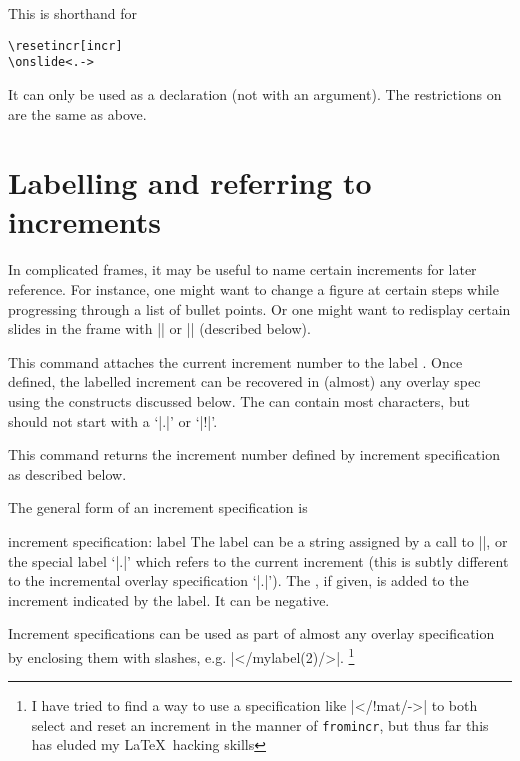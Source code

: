 \documentclass[a4paper]{ltxdoc}
\begin{document}
\begin{command}{\fromincr{}}
  This is shorthand for
\begin{verbatim}
\resetincr[incr]
\onslide<.->
\end{verbatim}
It can only be used as a declaration (not with an argument).  The restrictions
on  are the same as above.  
\end{command}


\section{Labelling and referring to increments}\label{sec:labels}

In complicated frames, it may be useful to name certain increments for later
reference.  For instance, one might want to change a figure at certain steps
while progressing through a list of bullet points.  Or one might want to
redisplay certain slides in the frame with |\afterframe| or |\handoutframe|
(described below).

\begin{command}{\incrlabel {}}
  This command attaches the current increment number to the label .
  Once defined, the labelled increment can be recovered in (almost) any overlay
  spec using the constructs discussed below.  The  can contain most
  characters, but should not start with a `|.|'  or `|!|'.
\end{command}

\begin{command}{\incrref {}}
  This command returns the increment number defined by increment specification
   as described below.
\end{command}

\noindent
The general form of an increment specification is
\begin{command}{{increment specification}: label\opt{[(offset)]}}
  The label can be a string assigned by a call to |\incrlabel|, or the special
  label `|.|' which refers to the current increment (this is subtly different to
  the incremental overlay specification `|.|').  The , if given, is
  added to the increment indicated by the label.  It can be negative.

  Increment specifications can be used as part of almost any overlay
  specification by enclosing them with slashes, e.g. |</mylabel(2)/>|.
  \footnote{I have tried to find a way
      to use a specification like |</!mat/->| to both select and reset an
      increment in the manner of \texttt{fromincr}, but thus far this has eluded my
      \LaTeX\ hacking skills}
\end{command}
\end{document}
